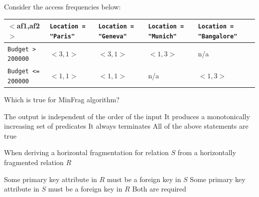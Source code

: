 \documentclass[12pt,a4paper,answers]{exam} %
\begin{document}
\begin{flushleft}
\begin{multicols*}{2}
\begin{questions}
\question Consider the access frequencies below: 
\begin{coltab}
\begin{tabu}{X[cm]|*{4}{X[cm]}}
$<$af1,af2$>$ & \texttt{Location = "Paris"} & \texttt{Location = "Geneva"}  & \texttt{Location = "Munich"} & \texttt{Location = "Bangalore"} \\
\hline
\hline
\texttt{Budget > 200000} & $<3,1>$ & $<3,1>$ & $<1,3>$ & n/a \\
\texttt{Budget <= 200000} & $<1,1>$ & $<1,1>$ & n/a & $<1,3>$ \\
\hline
\end{tabu}
\end{coltab}

\question Which is true for MinFrag algorithm?
\begin{checkboxes}
\choice The output is independent of the order of the input
\choice It produces a monotonically increasing set of predicates
\CorrectChoice It always terminates
\choice All of the above statements are true
\end{checkboxes}


\question When deriving a horizontal fragmentation for relation $S$ from a horizontally fragmented relation $R$
\begin{checkboxes}
\CorrectChoice Some primary key attribute in $R$ must be a foreign key in $S$
\choice Some primary key attribute in $S$ must be a foreign key in $R$
\choice Both are required
\end{checkboxes}




\end{questions}
\end{multicols*}
\end{flushleft}
\end{document}
